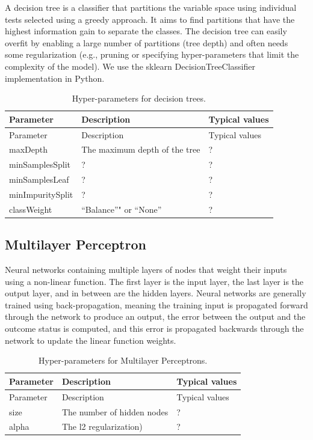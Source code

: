 \documentclass[11pt]{book}
\theoremstyle{definition}
\theoremstyle{definition}
\theoremstyle{definition}
\theoremstyle{remark}
\begin{document}
A decision tree is a classifier that partitions the variable space using individual tests selected using a greedy approach. It aims to find partitions that have the highest information gain to separate the classes. The decision tree can easily overfit by enabling a large number of partitions (tree depth) and often needs some regularization (e.g., pruning or specifying hyper-parameters that limit the complexity of the model). We use the sklearn DecisionTreeClassifier implementation in Python.

\begin{longtable}[]{@{}lll@{}}
\caption{\label{tab:decisionTreeParameters} Hyper-parameters for decision trees.}\tabularnewline
\toprule
Parameter & Description & Typical values\tabularnewline
\midrule
\endfirsthead
\toprule
Parameter & Description & Typical values\tabularnewline
\midrule
\endhead
maxDepth & The maximum depth of the tree & ?\tabularnewline
minSamplesSplit & ? & ?\tabularnewline
minSamplesLeaf & ? & ?\tabularnewline
minImpuritySplit & ? & ?\tabularnewline
classWeight & ``Balance''" or ``None'' & ?\tabularnewline
\bottomrule
\end{longtable}

\hypertarget{multilayer-perceptron}{%
\subsection{Multilayer Perceptron}\label{multilayer-perceptron}}

Neural networks containing multiple layers of nodes that weight their inputs using a non-linear function. The first layer is the input layer, the last layer is the output layer, and in between are the hidden layers. Neural networks are generally trained using back-propagation, meaning the training input is propagated forward through the network to produce an output, the error between the output and the outcome status is computed, and this error is propagated backwards through the network to update the linear function weights.

\begin{longtable}[]{@{}lll@{}}
\caption{\label{tab:mpParameters} Hyper-parameters for Multilayer Perceptrons.}\tabularnewline
\toprule
Parameter & Description & Typical values\tabularnewline
\midrule
\endfirsthead
\toprule
Parameter & Description & Typical values\tabularnewline
\midrule
\endhead
size & The number of hidden nodes & ?\tabularnewline
alpha & The l2 regularization) & ?\tabularnewline
\bottomrule
\end{longtable}
\end{document}
